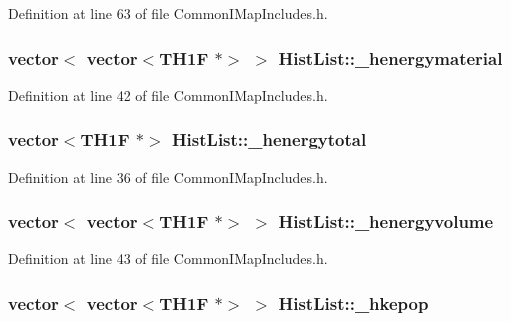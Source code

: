 Definition at line 63 of file Common\-I\-Map\-Includes.\-h.

\hypertarget{struct_hist_list_a564e91e80b3034576f04fac4c2ee6526}{
\subsubsection[{\-\_\-henergymaterial}]{\setlength{\rightskip}{0pt plus 5cm}vector$<$ vector$<$T\-H1\-F $\ast$$>$ $>$ Hist\-List\-::\-\_\-henergymaterial}}\label{struct_hist_list_a564e91e80b3034576f04fac4c2ee6526}


Definition at line 42 of file Common\-I\-Map\-Includes.\-h.

\hypertarget{struct_hist_list_a68a0662b12892ababb9e0e10f8605415}{
\subsubsection[{\-\_\-henergytotal}]{\setlength{\rightskip}{0pt plus 5cm}vector$<$T\-H1\-F $\ast$$>$ Hist\-List\-::\-\_\-henergytotal}}\label{struct_hist_list_a68a0662b12892ababb9e0e10f8605415}


Definition at line 36 of file Common\-I\-Map\-Includes.\-h.

\hypertarget{struct_hist_list_a0299555f2a7f77bff06903ae8a83612f}{
\subsubsection[{\-\_\-henergyvolume}]{\setlength{\rightskip}{0pt plus 5cm}vector$<$ vector$<$T\-H1\-F $\ast$$>$ $>$ Hist\-List\-::\-\_\-henergyvolume}}\label{struct_hist_list_a0299555f2a7f77bff06903ae8a83612f}


Definition at line 43 of file Common\-I\-Map\-Includes.\-h.

\hypertarget{struct_hist_list_acc57842a9e28b92139e8d0afac128116}{
\subsubsection[{\-\_\-hkepop}]{\setlength{\rightskip}{0pt plus 5cm}vector$<$ vector$<$T\-H1\-F $\ast$$>$ $>$ Hist\-List\-::\-\_\-hkepop}}\label{struct_hist_list_acc57842a9e28b92139e8d0afac128116}


